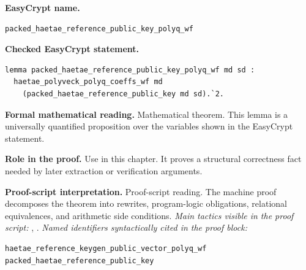\begin{formaltheorem}
\noindent\textbf{EasyCrypt name.}
\begin{lstlisting}[language=EasyCrypt,basicstyle=\ttfamily\scriptsize]
packed_haetae_reference_public_key_polyq_wf
\end{lstlisting}
\noindent\textbf{Checked EasyCrypt statement.}
\begin{lstlisting}[language=EasyCrypt,basicstyle=\ttfamily\scriptsize]
lemma packed_haetae_reference_public_key_polyq_wf md sd :
  haetae_polyveck_polyq_coeffs_wf md
    (packed_haetae_reference_public_key md sd).`2.
\end{lstlisting}
\noindent\textbf{Formal mathematical reading.}
Mathematical theorem. This lemma is a universally quantified proposition over the variables shown in the EasyCrypt statement.

\noindent\textbf{Role in the proof.}
Use in this chapter. It proves a structural correctness fact needed by later extraction or verification arguments.

\noindent\textbf{Proof-script interpretation.}
Proof-script reading. The machine proof decomposes the theorem into rewrites, program-logic obligations, relational equivalences, and arithmetic side conditions.
\emph{Main tactics visible in the proof script:} , .
\emph{Named identifiers syntactically cited in the proof block:}
\begin{lstlisting}[language=EasyCrypt,basicstyle=\ttfamily\scriptsize]
haetae_reference_keygen_public_vector_polyq_wf
packed_haetae_reference_public_key
\end{lstlisting}

\end{formaltheorem}

